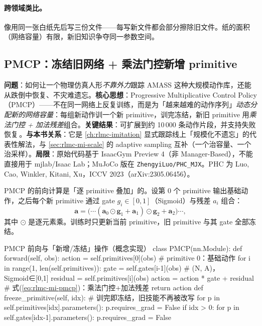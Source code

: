 \paragraph{跨领域类比。}像用同一张白纸先后写三份文件——每写新文件都会部分擦除旧文件。纸的面积（网络容量）有限，新旧知识争夺同一参数空间。

\subsection{PMCP：冻结旧网络 + 乘法门控新增 primitive}
\label{sec:rlmc-mi-phc-pmcp}

\begin{paper}\label{paper:rlmc-mi-phc}
\textbf{问题}：如何让一个物理仿真人形\emph{不靠外力}跟踪 AMASS 这种大规模动作库，还能从跌倒中恢复、不灾难遗忘。\textbf{核心思想}：Progressive Multiplicative Control Policy（PMCP）——不在同一网络上反复训练，而是为「越来越难的动作序列」\emph{动态分配新的网络容量}：每组新动作训一个新 primitive，训完冻结，新旧 primitive 用\emph{乘法门控 + 加法残差}组合。\textbf{关键结果}：可扩展到约 10\,000 条动作片段，并支持失败恢复\,\cite{luo2023phc}。\textbf{与本书关系}：它是 \cref{ch:rlmc-imitation} 显式跟踪线上「规模化不遗忘」的代表性解法，与 \cref{sec:rlmc-mi-scale} 的 adaptive sampling 互补（一个治容量、一个治采样）。\textbf{局限}：原始代码基于 IsaacGym Preview 4（非 Manager-Based），不能直接用于 mjlab/Isaac Lab；MuJoCo 版在 \texttt{ZhengyiLuo/PHC\_MJX}。PHC 为 Luo, Cao, Winkler, Kitani, Xu，ICCV 2023（arXiv:2305.06456）。
\end{paper}

PMCP 的前向计算是「逐 primitive 叠加」的。设第 0 个 primitive 输出基础动作，之后每个新 primitive 通过 gate $g_i\in[0,1]$（Sigmoid）与残差 $a_i$ 组合：
\begin{equation}
\mathbf{a} = \big(\cdots(\mathbf{a}_0\odot \mathbf{g}_1 + \mathbf{a}_1)\odot \mathbf{g}_2 + \mathbf{a}_2\big)\cdots,
\label{eq:rlmc-mi-pmcp}
\end{equation}
其中 $\odot$ 是逐元素乘。训练时只更新当前 primitive，旧 primitive 与其 gate 全部冻结。

\begin{codebox}[Python]{PMCP 前向与「新增/冻结」操作（概念实现）}
class PMCP(nn.Module):
    def forward(self, obs):
        action = self.primitives[0](obs)                  # primitive 0：基础动作
        for i in range(1, len(self.primitives)):
            gate = self.gates[i-1](obs)                    # (N, A)，Sigmoid∈[0,1]
            residual = self.primitives[i](obs)
            action = action * gate + residual             # 式(\ref{eq:rlmc-mi-pmcp})：乘法门控+加法残差
        return action
    def freeze_primitive(self, idx):                       # 训完即冻结，旧技能不再被改写
        for p in self.primitives[idx].parameters(): p.requires_grad = False
        if idx > 0:
            for p in self.gates[idx-1].parameters(): p.requires_grad = False
\end{codebox}

